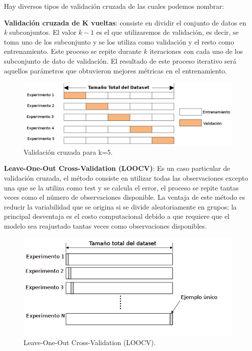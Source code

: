 Hay diversos tipos de validación cruzada de las cuales podemos nombrar:


\par \textbf{Validación cruzada de K vueltas}: consiste en dividir el conjunto de datos en \textit{k} subconjuntos. El valor $k-1 $ es el que utilizaremos de validación, es decir, se toma uno de los subconjunto y se los utiliza como validación y el resto como entrenamiento.  Este proceso se repite durante $k $ iteraciones con cada uno de los subconjunto de dato de validación. El resultado de este proceso iterativo será aquellos parámetros que obtuvieron mejores métricas en el entrenamiento.
\begin{figure}[H]
 \centering
  \includegraphics[scale=0.4,keepaspectratio=true,clip=true]{imagenes/MarcoTeorico/crossvalidat.png}
  \caption{Validación cruzada para k=5.}%
	\label{Fig: crossvalidation}
\end{figure}

\par \textbf{Leave-One-Out Cross-Validation (LOOCV)}: Es un caso particular de validación cruzada, el método consiste en utilizar todas las observaciones excepto una que se la utiliza como test y se calcula el error, el proceso se repite tantas veces como el número de observaciones disponible. La ventaja de este método es reducir la variabilidad que se origina si se divide aleatoriamente en grupos; la principal desventaja es el costo computacional debido a que requiere que el modelo sea reajustado tantas veces como observaciones disponibles.


\begin{figure}[H]
 \centering
  \includegraphics[scale=0.4,keepaspectratio=true,clip=true]{imagenes/MarcoTeorico/cross-validation-LOOCV.png}
  \caption{Leave-One-Out Cross-Validation (LOOCV).}%
	\label{Fig: crossvalidation-LOOCV}
\end{figure}

